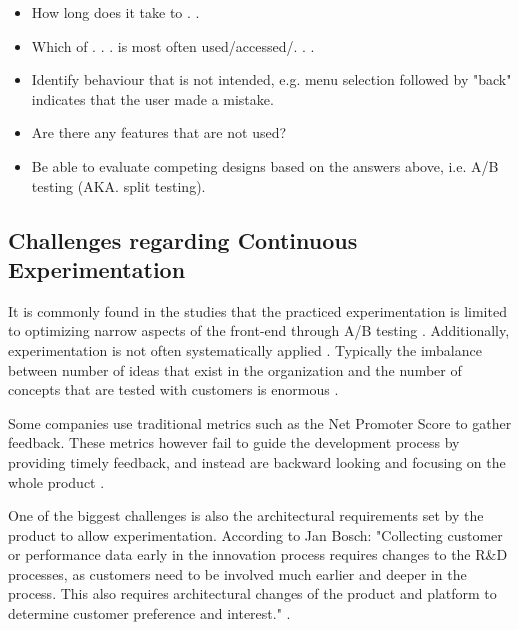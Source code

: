 \documentclass[english, grading]{tktltiki2}
\theoremstyle{definition}
\theoremstyle{remark}
\begin{document}
\begin{itemize}
\item  How long does it take to . . 
\item  Which of . . . is most often used/accessed/. . .
\item  Identify behaviour that is not intended, e.g. menu selection followed by "back" indicates that the user made a mistake.
\item  Are there any features that are not used?
\item  Be able to evaluate competing designs based on the answers above, i.e. A/B testing (AKA. split testing).
\end{itemize}

\subsection{Challenges regarding Continuous Experimentation}

It is commonly found in the studies that the practiced experimentation is limited to optimizing narrow aspects of the front-end through A/B testing \cite{bosch2012building}. Additionally, experimentation is not often systematically applied \cite{bosch2012building}. Typically the imbalance between number of ideas that exist in the organization and the number of concepts that are tested with customers is enormous \cite{bosch2012building}. 

Some companies use traditional metrics such as the Net Promoter Score \cite{reichheld2003one} to gather feedback. These metrics however fail to guide the development process by providing timely feedback, and instead are backward looking and focusing on the whole product \cite{bosch2012building}.

One of the biggest challenges is also the architectural requirements set by the product to allow experimentation. According to Jan Bosch: "Collecting customer or performance data early in the innovation process requires changes to the R\&D processes, as customers need to be involved much earlier and deeper in the process. This also requires architectural changes of the product and platform to determine customer preference and interest." \cite{bosch2012building}.
\end{document}
